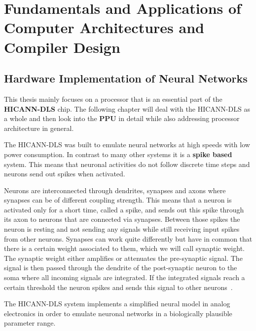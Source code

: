 \chapter{Fundamentals and Applications of Computer Architectures and Compiler Design}
\label{ch:methods}

\section{Hardware Implementation of Neural Networks}
This thesis mainly focuses on a processor that is an essential part of the \textbf{\ac{HICANN-DLS}} chip.
The following chapter will deal with the \ac{HICANN-DLS} as a whole and then look into the \textbf{\ac{PPU}} in detail while also addressing processor architecture in general.

The \ac{HICANN-DLS} was built to emulate neural networks at high speeds with low power consumption.
In contrast to many other systems  it is a \textbf{spike based} system.
This means that neuronal activities do not follow discrete time steps and neurons send out spikes when activated.

Neurons are interconnected through dendrites, synapses and axons where synapses can be of different coupling strength. 
This means that a neuron is activated only for a short time, called a spike, and sends out this spike through its axon to neurons that are connected via synapses.
Between those spikes the neuron is resting and not sending any signals while still receiving input spikes from other neurons.
Synapses can work quite differently but have in common that there is a certain weight associated to them, which we will call synaptic weight.
The synaptic weight either amplifies or attenuates the pre-synaptic signal.
The signal is then passed through the dendrite of the post-synaptic neuron to the soma where all incoming signals are integrated.
If the integrated signals reach a certain threshold the neuron spikes and sends this signal to other neurons~\citep{silbernagl2009color}.

The \ac{HICANN-DLS} system implements a simplified neural model in analog electronics in order to emulate neuronal networks in a biologically plausible parameter range.


